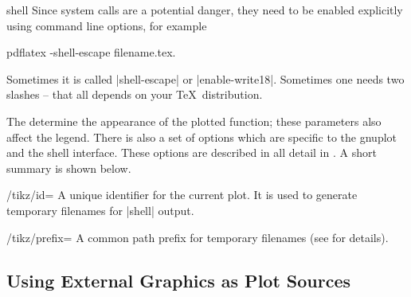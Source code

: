 {\begin{addplotoperation}[]{shell}{}
Since system calls are a potential danger, they need to be enabled explicitly using command line options, for example
\begin{codeexample}
pdflatex -shell-escape filename.tex.
\end{codeexample}
Sometimes it is called |shell-escape| or |enable-write18|. Sometimes one needs two slashes -- that all depends on your \TeX\ distribution.
\begin{codeexample}[]
\end{codeexample}

\begin{codeexample}[]
\end{codeexample}

The  determine the appearance of the plotted function; these parameters also affect the legend. There is also a set of options which are specific to the gnuplot and the shell interface. These options are described in all detail in \cite[section~19.6]{tikz}. A short summary is shown below.
\end{addplotoperation}

\begin{key}{/tikz/id=}
	 A unique identifier for the current plot. It is used to generate temporary filenames for |shell| output.
\end{key}

\begin{key}{/tikz/prefix=}
	 A common path prefix for temporary filenames (see \cite[section~19.6]{tikz} for details).
\end{key}

\subsection{Using External Graphics as Plot Sources}
{

}}
